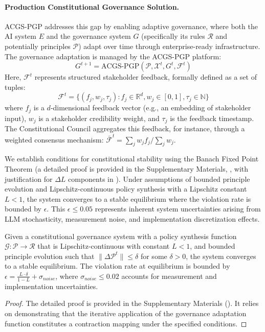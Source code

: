 \documentclass[manuscript,screen,9pt]{acmart}
\begin{document}
\paragraph{Production Constitutional Governance Solution.} ACGS-PGP addresses this gap by enabling adaptive governance, where both the AI system $E$ and the governance system $G$ (specifically its rules $\mathcal{R}$ and potentially principles $\mathcal{P}$) adapt over time through enterprise-ready infrastructure. The governance adaptation is managed by the ACGS-PGP platform:
\[G^{t+1} = \text{ACGS-PGP}(\mathcal{P}, \mathcal{X}^t, G^t, \mathcal{F}^t)\]
Here, $\mathcal{F}^t$ represents structured stakeholder feedback, formally defined as a set of tuples:
\[\mathcal{F}^t = \{(f_j, w_j, \tau_j) : f_j \in \mathbb{R}^d, w_j \in [0,1], \tau_j \in \mathbb{N}\}\]
where $f_j$ is a $d$-dimensional feedback vector (e.g., an embedding of stakeholder input), $w_j$ is a stakeholder credibility weight, and $\tau_j$ is the feedback timestamp. The Constitutional Council aggregates this feedback, for instance, through a weighted consensus mechanism: $\bar{\mathcal{F}}^t = \sum_{j} w_j f_j / \sum_{j} w_j$.

We establish conditions for constitutional stability using the Banach Fixed Point Theorem (a detailed proof is provided in the Supplementary Materials, , with justification for $\Delta L$ components in ). Under assumptions of bounded principle evolution and Lipschitz-continuous policy synthesis with a Lipschitz constant $L < 1$, the system converges to a stable equilibrium where the violation rate is bounded by $\epsilon$. This $\epsilon \leq 0.05$ represents inherent system uncertainties arising from LLM stochasticity, measurement noise, and implementation discretization effects.

\begin{theorem}
	\label{thm:constitutional_stability}
	Given a constitutional governance system with a policy synthesis function $\mathcal{G}: \mathcal{P} \rightarrow \mathcal{R}$ that is Lipschitz-continuous with constant $L < 1$, and bounded principle evolution such that $\|\Delta \mathcal{P}^t\| \leq \delta$ for some $\delta > 0$, the system converges to a stable equilibrium. The violation rate at equilibrium is bounded by $\epsilon = \frac{L \cdot \delta}{1-L} + \sigma_{noise}$, where $\sigma_{noise} \leq 0.02$ accounts for measurement and implementation uncertainties.
\end{theorem}
\begin{proof}
	The detailed proof is provided in the Supplementary Materials (). It relies on demonstrating that the iterative application of the governance adaptation function constitutes a contraction mapping under the specified conditions.
\end{proof}
\end{document}
